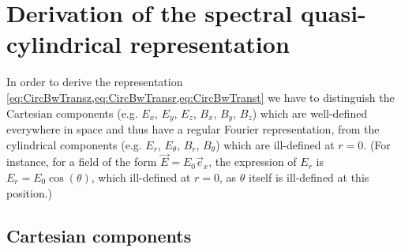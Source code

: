 
\section{Derivation of the spectral quasi-cylindrical representation}
\label{sec:CircTrans}

In order to derive the representation
\cref{eq:CircBwTransz,eq:CircBwTransr,eq:CircBwTranst} we have to
distinguish the Cartesian components (e.g. $E_x$, $E_y$, $E_z$, $B_x$,
$B_y$, $B_z$) which are well-defined everywhere in space and thus have a regular
Fourier representation, from the cylindrical components (e.g. $E_r$,
$E_\theta$, $B_r$, $B_\theta$) which are ill-defined at $r=0$. (For instance, for a
field of the form $\vec{E} = E_0 \vec{e}_x$, the expression of $E_r$
is $E_r = E_0 \cos(\theta)$, which ill-defined at $r=0$, as $\theta$
itself is ill-defined at this position.)

\subsection{Cartesian components}

